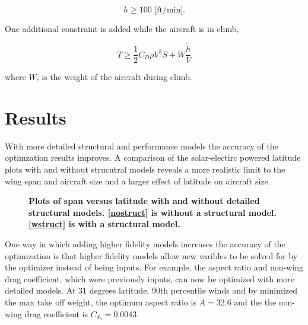 \documentclass[]{aiaa-tc}%
\begin{document}
\begin{equation}
    \label{e:climbrate}
    \dot{h} \geq 100 \text{ [ft/min]}.
\end{equation}

One additional constraint is added while the aircraft is in climb, 

\begin{equation}
    \label{e:climb}
    T \geq \frac{1}{2} C_D \rho V^2 S + W \frac{\dot{h}}{V}
\end{equation}

where $W$, is the weight of the aircraft during climb.  

\section{Results}

With more detailed structural and performance models the accuracy of the optimzation results improves. 
A comparison of the solar-electirc powered latitude plots with and without strucutral models reveals a more realistic limit to the wing span and aircraft size and a larger effect of latitude on aircraft size. 

\begin{figure}[H]
 \begin{subfigmatrix}{2}%
 \end{subfigmatrix}
 \caption{\textbf{Plots of span versus latitude with and without detailed structural models.  \ref{nostruct} is without a structural model.  \ref{wstruct} is with a structural model.}}
 \label{f:latvsmtowtrade}
\end{figure}

One way in which adding higher fidelity models increases the accuracy of the optimization is that higher fidelity models allow new varibles to be solved for by the optimizer instead of being inputs. 
For example, the aspect ratio and non-wing drag coefficient, which were previously inputs, can now be optimized with more detailed models.  
At 31 degrees latitude, 90th percentile winds and by minimized the max take off weight, the optimum aspect ratio is $A=32.6$ and the the non-wing drag coefficient is $C_{d_0} = 0.0043$.
\end{document}
